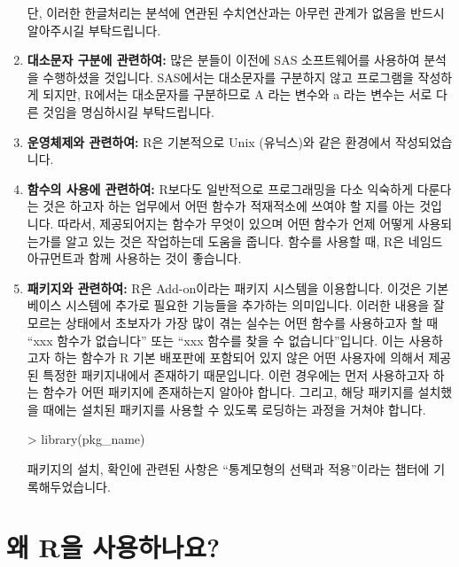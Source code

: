 \documentclass{book}
\begin{document}
\begin{enumerate}
단, 이러한 한글처리는 분석에 연관된 수치연산과는 아무런 관계가 없음을 반드시 알아주시길 부탁드립니다.


	\item \textbf{대소문자 구분에 관련하여:}
많은 분들이 이전에 SAS 소프트웨어를 사용하여 분석을 수행하셨을 것입니다.
SAS에서는 대소문자를 구분하지 않고 프로그램을 작성하게 되지만, R에서는 대소문자를 구분하므로 A 라는 변수와 a 라는 변수는 서로 다른 것임을 명심하시길 부탁드립니다. 


	\item \textbf{운영체제와 관련하여:}
R은 기본적으로 Unix (유닉스)와 같은 환경에서 작성되었습니다. 


	\item \textbf{함수의 사용에 관련하여:}  R보다도 일반적으로 프로그래밍을 다소 익숙하게 다룬다는 것은 하고자 하는 업무에서 어떤 함수가 적재적소에 쓰여야 할 지를 아는 것입니다. 
	따라서, 제공되어지는 함수가 무엇이 있으며 어떤 함수가 언제 어떻게 사용되는가를 알고 있는 것은 작업하는데 도움을 줍니다. 
	함수를 사용할 때,  R은 네임드 아규먼트과 함께 사용하는 것이 좋습니다.  

	\item \textbf{패키지와 관련하여: }
R은 Add-on이라는 패키지 시스템을 이용합니다. 
이것은 기본 베이스 시스템에 추가로 필요한 기능들을 추가하는 의미입니다.
이러한 내용을 잘 모르는 상태에서 초보자가 가장 많이 겪는 실수는 어떤 함수를 사용하고자 할 때 ``xxx 함수가 없습니다'' 또는 ``xxx 함수를 찾을 수 없습니다''입니다.
이는 사용하고자 하는 함수가 R 기본 배포판에 포함되어 있지 않은 어떤 사용자에 의해서 제공된 특정한 패키지내에서 존재하기 때문입니다.
이런 경우에는 먼저 사용하고자 하는 함수가 어떤 패키지에 존재하는지 알아야 합니다.  
그리고, 해당 패키지를 설치했을 때에는 설치된 패키지를 사용할 수 있도록 로딩하는 과정을 거쳐야 합니다.

\begin{Schunk}
\begin{Soutput}
> library(pkg_name)	
\end{Soutput}
\end{Schunk}

패키지의 설치, 확인에 관련된 사항은 ``통계모형의 선택과 적용''이라는 챕터에 기록해두었습니다. 

\end{enumerate}



\section{왜 R을 사용하나요?}
\end{document}
